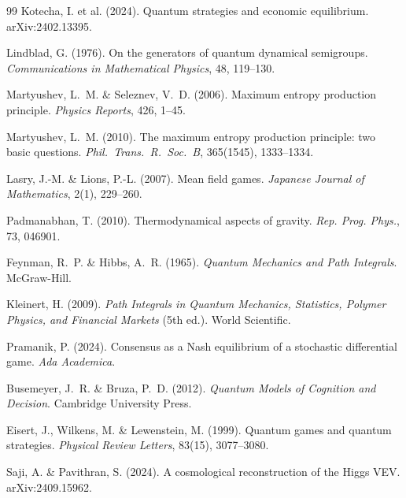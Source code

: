 \documentclass[12pt,a4paper]{article}
\theoremstyle{remark}
\begin{document}
\begin{thebibliography}{99}
Kotecha, I. et al. (2024).
\newblock Quantum strategies and economic equilibrium.
\newblock arXiv:2402.13395.

Lindblad, G. (1976).
\newblock On the generators of quantum dynamical semigroups.
\newblock \textit{Communications in Mathematical Physics}, 48, 119--130.

Martyushev, L.~M. \& Seleznev, V.~D. (2006).
\newblock Maximum entropy production principle.
\newblock \textit{Physics Reports}, 426, 1--45.

Martyushev, L.~M. (2010).
\newblock The maximum entropy production principle: two basic questions.
\newblock \textit{Phil.\ Trans.\ R.\ Soc.\ B}, 365(1545), 1333--1334.

Lasry, J.-M. \& Lions, P.-L. (2007).
\newblock Mean field games.
\newblock \textit{Japanese Journal of Mathematics}, 2(1), 229--260.

Padmanabhan, T. (2010).
\newblock Thermodynamical aspects of gravity.
\newblock \textit{Rep. Prog. Phys.}, 73, 046901.

Feynman, R.~P. \& Hibbs, A.~R. (1965).
\newblock \textit{Quantum Mechanics and Path Integrals}.
\newblock McGraw-Hill.

Kleinert, H. (2009).
\newblock \textit{Path Integrals in Quantum Mechanics, Statistics, Polymer Physics, and Financial Markets} (5th ed.).
\newblock World Scientific.

Pramanik, P. (2024).
\newblock Consensus as a Nash equilibrium of a stochastic differential game.
\newblock \textit{Ada Academica}.

Busemeyer, J.~R. \& Bruza, P.~D. (2012).
\newblock \textit{Quantum Models of Cognition and Decision}.
\newblock Cambridge University Press.

Eisert, J., Wilkens, M. \& Lewenstein, M. (1999).
\newblock Quantum games and quantum strategies.
\newblock \textit{Physical Review Letters}, 83(15), 3077--3080.

Saji, A. \& Pavithran, S. (2024).
\newblock A cosmological reconstruction of the Higgs VEV.
\newblock arXiv:2409.15962.


\end{thebibliography}
\end{document}
